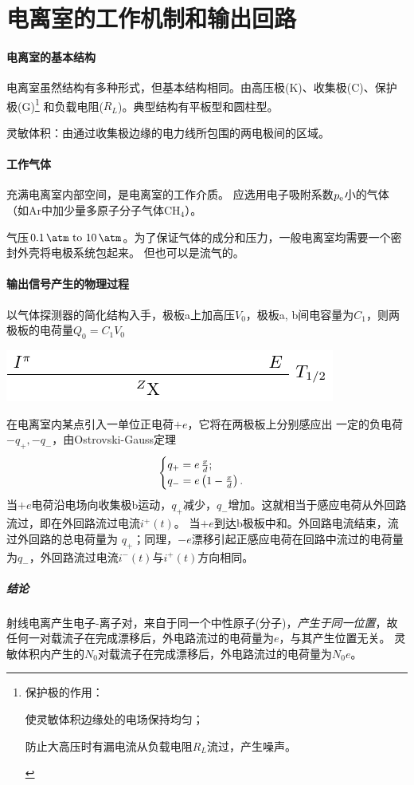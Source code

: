 \section{电离室的工作机制和输出回路}

\paragraph{电离室的基本结构}
电离室虽然结构有多种形式，但基本结构相同。由高压极(K)、收集极(C)、保护极(G)\footnote{
	保护极的作用：
	\begin{compactenum}
		\item 使灵敏体积边缘处的电场保持均匀；
		\item 防止大高压时有漏电流从负载电阻$R_L$流过，产生噪声。
	\end{compactenum}
}
和负载电阻($R_L$)。典型结构有平板型和圆柱型。



灵敏体积：由通过收集极边缘的电力线所包围的两电极间的区域。
\paragraph{工作气体}
充满电离室内部空间，是电离室的工作介质。
应选用电子吸附系数$p_\mathrm e$小的气体（如Ar中加少量多原子分子气体CH$_4$）。

气压$\SIrange{0.1}{10}{\atm}$。为了保证气体的成分和压力，一般电离室均需要一个密封外壳将电极系统包起来。
但也可以是流气的。
\paragraph{输出信号产生的物理过程}
以气体探测器的简化结构入手，极板a上加高压$V_0$，极板a, b间电容量为$C_1$，则两极板的电荷量$Q_0=C_1V_0$

\begin{center}
	\includegraphics[page=14]{figures/tikz/layouts.pdf}
\end{center}
在电离室内某点引入一单位正电荷$+e$，它将在两极板上分别感应出
一定的负电荷$-q_+,-q_-$，由Ostrovski-Gauss定理  %
\[
	\begin{cases}
		q_+=e\,\frac xd;\\
		q_-=e\left(1-\frac xd\right).
	\end{cases}
\]
当$+e$电荷沿电场向收集极b运动，$q_+$减少，$q_-$增加。这就相当于感应电荷从外回路流过，即在外回路流过电流$i^+(t)$。
当$+e$到达b极板中和。外回路电流结束，流过外回路的总电荷量为  $q_+$；同理，$-e$漂移引起正感应电荷在回路中流过的电荷量为$q_-$，外回路流过电流$i^-(t)$与$i^+(t)$方向相同。
\subparagraph{结论}
射线电离产生电子-离子对，来自于同一个中性原子(分子)，\textit{产生于同一位置}，故任何一对载流子在完成漂移后，外电路流过的电荷量为$e$，与其产生位置无关。
灵敏体积内产生的$N_0$对载流子在完成漂移后，外电路流过的电荷量为$N_0e$。

